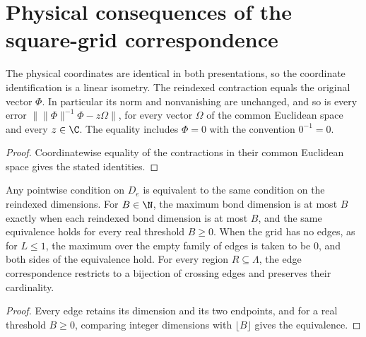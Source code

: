 \section{Physical consequences of the square-grid correspondence}

\begin{lemma}
    \label{thm:peps_square_vector_error}
    \leanok
    The physical coordinates are identical in both presentations, so the coordinate
    identification is a linear isometry. The reindexed contraction equals the
    original vector $\Phi$. In particular its norm and nonvanishing are unchanged,
    and so is every error $\|\|\Phi\|^{-1}\Phi-z\Omega\|$, for every vector
    $\Omega$ of the common Euclidean space and every $z\in\C$.
    The equality includes $\Phi=0$ with the convention $0^{-1}=0$.
\end{lemma}
\begin{proof}
    \leanok
    Coordinatewise equality of the contractions in their common Euclidean space
    gives the stated identities.
\end{proof}

\begin{lemma}
    \label{thm:peps_square_bonds_boundary}
    \leanok
    Any pointwise condition on $D_e$ is equivalent to the same condition on the
    reindexed dimensions. For $B\in\N$, the maximum bond dimension is at most
    $B$ exactly when each reindexed bond dimension is at most $B$, and the same
    equivalence holds for every real threshold $B\ge0$.
    When the grid has no edges, as for $L\le1$, the maximum over the empty
    family of edges is taken to be $0$, and both sides of the equivalence hold.
    For every region $R\subseteq\Lambda$, the edge correspondence restricts to
    a bijection of crossing edges and preserves their cardinality.
\end{lemma}
\begin{proof}
    \leanok
    Every edge retains its dimension and its two endpoints, and for a real
    threshold $B\ge0$, comparing integer dimensions with $\lfloor B\rfloor$
    gives the equivalence.
\end{proof}

